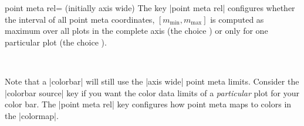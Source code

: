 \begin{pgfplotskey}{point meta rel= (initially axis wide)}
	The key |point meta rel| configures whether the interval of all point meta coordinates, $[m_{\text{min}},m_{\text{max}}]$ is computed as maximum over all plots in the complete axis (the choice ) or only for one particular plot (the choice ).

%
\begin{codeexample}[]
~
\end{codeexample}

	Note that a |colorbar| will still use the |axis wide| point meta limits. Consider the |colorbar source| key if you want the color data limits of a \emph{particular} plot for your color bar. The |point meta rel| key configures how point meta maps to colors in the |colormap|.
\end{pgfplotskey}

